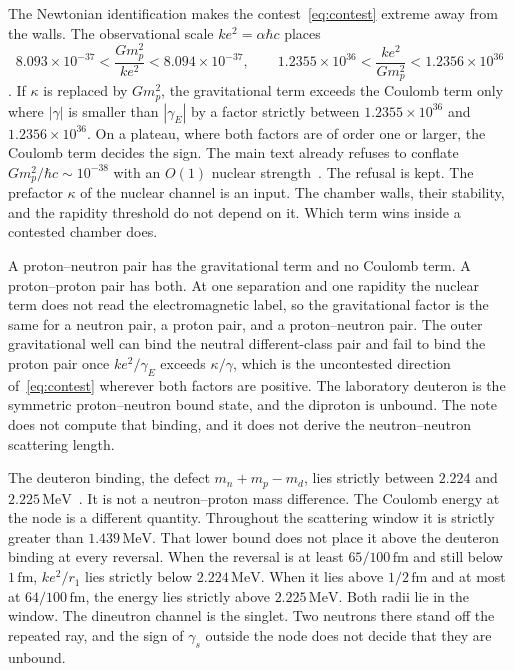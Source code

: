 \documentclass[a4paper]{article}
\begin{document}
The Newtonian identification makes the contest~\eqref{eq:contest} extreme away from the walls. The observational scale \(ke^{2}=\alpha\hbar c\) places
\begin{equation}
\label{eq:ratio}
8.093\times 10^{-37}
  <\frac{G m_p^{2}}{ke^{2}}
  <8.094\times 10^{-37},
\qquad
1.2355\times 10^{36}
  <\frac{ke^{2}}{G m_p^{2}}
  <1.2356\times 10^{36}
\end{equation}
\cite{codata2018}. If \(\kappa\) is replaced by \(G m_p^{2}\), the gravitational term exceeds the Coulomb term only where \(|\gamma|\) is smaller than \(|\gamma_E|\) by a factor strictly between \(1.2355\times 10^{36}\) and \(1.2356\times 10^{36}\). On a plateau, where both factors are of order one or larger, the Coulomb term decides the sign. The main text already refuses to conflate \(G m_p^{2}/\hbar c\sim 10^{-38}\) with an \(O(1)\) nuclear strength~\cite{dst-main}. The refusal is kept. The prefactor \(\kappa\) of the nuclear channel is an input. The chamber walls, their stability, and the rapidity threshold do not depend on it. Which term wins inside a contested chamber does.

A proton--neutron pair has the gravitational term and no Coulomb term. A proton--proton pair has both. At one separation and one rapidity the nuclear term does not read the electromagnetic label, so the gravitational factor is the same for a neutron pair, a proton pair, and a proton--neutron pair. The outer gravitational well can bind the neutral different-class pair and fail to bind the proton pair once \(k e^{2}/\gamma_E\) exceeds \(\kappa/\gamma\), which is the uncontested direction of~\eqref{eq:contest} wherever both factors are positive. The laboratory deuteron is the symmetric proton--neutron bound state, and the diproton is unbound. The note does not compute that binding, and it does not derive the neutron--neutron scattering length.

The deuteron binding, the defect \(m_n+m_p-m_d\), lies strictly between \(2.224\) and \(2.225\,\mathrm{MeV}\)~\cite{codata2018}. It is not a neutron--proton mass difference. The Coulomb energy at the node is a different quantity. Throughout the scattering window it is strictly greater than \(1.439\,\mathrm{MeV}\). That lower bound does not place it above the deuteron binding at every reversal. When the reversal is at least \(65/100\,\mathrm{fm}\) and still below \(1\,\mathrm{fm}\), \(ke^{2}/r_1\) lies strictly below \(2.224\,\mathrm{MeV}\). When it lies above \(1/2\,\mathrm{fm}\) and at most at \(64/100\,\mathrm{fm}\), the energy lies strictly above \(2.225\,\mathrm{MeV}\). Both radii lie in the window. The dineutron channel is the singlet. Two neutrons there stand off the repeated ray, and the sign of \(\gamma_s\) outside the node does not decide that they are unbound.
\end{document}
